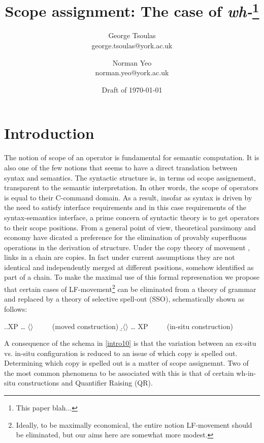 \documentclass[11pt]{article}
\begin{document}
\title{Scope assignment: The case of \textit{wh-}\thanks{This paper blah...}}
\author{George Tsoulas\\
george.tsoulas@york.ac.uk\\ \and
Norman Yeo\\
norman.yeo@york.ac.uk}
\date{Draft of \today}

\maketitle

\section{Introduction}
The notion of scope of an operator is fundamental for semantic computation.  It is also one of the few notions that seems to have a direct translation between syntax and semantics.  The syntactic structure is, in terms od scope assignement, transparent to the semantic interpretation.  In other words, the scope of operators is equal to their C-command domain.  As a result, insofar as syntax is driven by the need to satisfy interface requirements and in this case requirements of the syntax-semantics interface, a prime concern of syntactic theory is to get operators to their scope positions.  From a general point of view, theoretical parsimony and economy have dicated a preference for the elimination of provably superfluous operations in the derivation of structure. Under the copy theory of movement \citep{chomsky:1993}, links in a chain are copies.  In fact under current assumptions they are not identical and independently merged at different positions, somehow identified as part of a chain.  To make the maximal use of this formal represenation we propose that certain cases of LF-movement\footnote{Ideally, to be maximally economical, the entire notion LF-movement should be eliminated, but our aims here are somewhat more modest.} can be eliminated from a theory of grammar and replaced by a theory of selective spell-out (SSO), schematically shown as follows:

\ex.\label{intro10}\a.XP {\dots} $\langle$$\rangle$ $\qquad$ (moved construction)
    \b.$\langle$$\rangle$ {\dots} XP $\qquad$ (in-situ construction)

A consequence of the schema in \ref{intro10} is that the variation between an ex-situ vs. in-situ configuration is reduced to an issue of which copy is spelled out.  Determining which copy is spelled out is a matter of scope assignemnt. Two of the most common phenomena to be associated with this is that of certain wh-in-situ constructions and Quantifier Raising (QR).
\end{document}
